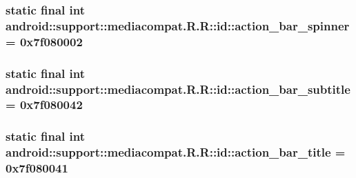 \hypertarget{classandroid_1_1support_1_1mediacompat_1_1_r_1_1id_b4e228862bb808cd9a6d310103a26d4d}{
\subsubsection[{action\_\-bar\_\-spinner}]{\setlength{\rightskip}{0pt plus 5cm}static final int android::support::mediacompat.R.R::id::action\_\-bar\_\-spinner = 0x7f080002}}
\label{classandroid_1_1support_1_1mediacompat_1_1_r_1_1id_b4e228862bb808cd9a6d310103a26d4d}


\hypertarget{classandroid_1_1support_1_1mediacompat_1_1_r_1_1id_a7b96e49383349c2972a4f221b4f71f8}{
\subsubsection[{action\_\-bar\_\-subtitle}]{\setlength{\rightskip}{0pt plus 5cm}static final int android::support::mediacompat.R.R::id::action\_\-bar\_\-subtitle = 0x7f080042}}
\label{classandroid_1_1support_1_1mediacompat_1_1_r_1_1id_a7b96e49383349c2972a4f221b4f71f8}


\hypertarget{classandroid_1_1support_1_1mediacompat_1_1_r_1_1id_b35c180106340185a3d3d0e559b11649}{
\subsubsection[{action\_\-bar\_\-title}]{\setlength{\rightskip}{0pt plus 5cm}static final int android::support::mediacompat.R.R::id::action\_\-bar\_\-title = 0x7f080041}}
\label{classandroid_1_1support_1_1mediacompat_1_1_r_1_1id_b35c180106340185a3d3d0e559b11649}


